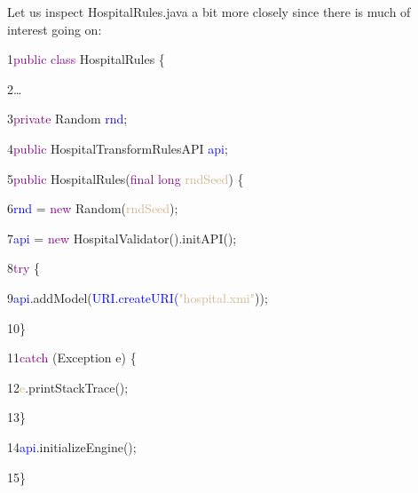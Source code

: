 {%

Let us inspect HospitalRules.java a bit more closely since there is much of interest going on:\newline\newline 

{

1\hspace{0.5cm}\textcolor{Purple}{public class} HospitalRules \{

2\hspace{0.5cm}…	

3\hspace{1cm}\textcolor{Purple}{private} Random \textcolor{blue}{rnd};

4\hspace{1cm}\textcolor{Purple}{public} HospitalTransformRulesAPI \textcolor{blue}{api};

5\hspace{1cm}\textcolor{Purple}{public} HospitalRules(\textcolor{Purple}{final long} \textcolor{Tan}{rndSeed}) \{

6\hspace{1.5cm}\textcolor{blue}{rnd} = \textcolor{Purple}{new} Random(\textcolor{Tan}{rndSeed});

7\hspace{1.5cm}\textcolor{blue}{api} = \textcolor{Purple}{new} HospitalValidator().initAPI();

8\hspace{1.5cm}\textcolor{Purple}{try} \{

9\hspace{2cm}\textcolor{blue}{api}.addModel(\textcolor{blue}{URI}.\textcolor{blue}{createURI(}\textcolor{Tan}{"hospital.xmi"})); 

10\hspace{1.5cm}\}

11\hspace{1.5cm}\textcolor{Purple}{catch} (Exception e) \{

12\hspace{2cm}\textcolor{Tan}{e}.printStackTrace();

13\hspace{1.5cm}\}

14\hspace{1.5cm}\textcolor{blue}{api}.initializeEngine();

15\hspace{1cm}\}

}}

